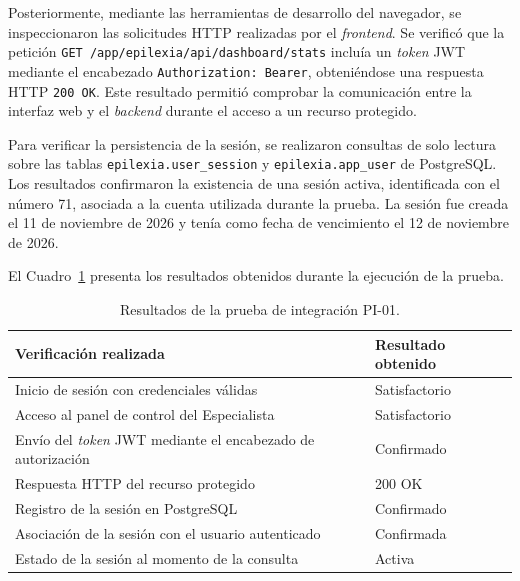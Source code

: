 Posteriormente, mediante las herramientas de desarrollo del navegador, se inspeccionaron las solicitudes HTTP realizadas por el \textit{frontend}. Se verificó que la petición \texttt{GET /app/epilexia/api/dashboard/stats} incluía un \textit{token} JWT mediante el encabezado \texttt{Authorization: Bearer}, obteniéndose una respuesta HTTP \texttt{200 OK}. Este resultado permitió comprobar la comunicación entre la interfaz web y el \textit{backend} durante el acceso a un recurso protegido.

Para verificar la persistencia de la sesión, se realizaron consultas de solo lectura sobre las tablas \texttt{epilexia.user\_session} y \texttt{epilexia.app\_user} de PostgreSQL. Los resultados confirmaron la existencia de una sesión activa, identificada con el número 71, asociada a la cuenta utilizada durante la prueba. La sesión fue creada el 11 de noviembre de 2026 y tenía como fecha de vencimiento el 12 de noviembre de 2026.

El Cuadro~\ref{tab:pi01_resultados} presenta los resultados obtenidos durante la ejecución de la prueba.

\begin{table}[htbp]
    \centering
    \caption{Resultados de la prueba de integración PI-01.}
    \label{tab:pi01_resultados}
    \small
    \begin{tabular}{|p{}|p{}|}
        \hline
        \textbf{Verificación realizada} & \textbf{Resultado obtenido} \\
        \hline
        Inicio de sesión con credenciales válidas & Satisfactorio \\
        \hline
        Acceso al panel de control del Especialista & Satisfactorio \\
        \hline
        Envío del \textit{token} JWT mediante el encabezado de autorización & Confirmado \\
        \hline
        Respuesta HTTP del recurso protegido & 200 OK \\
        \hline
        Registro de la sesión en PostgreSQL & Confirmado \\
        \hline
        Asociación de la sesión con el usuario autenticado & Confirmada \\
        \hline
        Estado de la sesión al momento de la consulta & Activa \\
        \hline
    \end{tabular}
\end{table}


